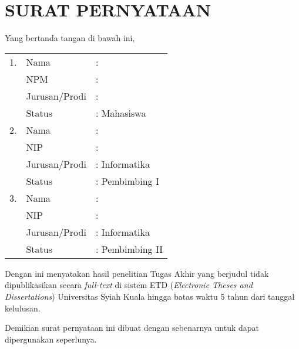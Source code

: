 \chapter*{SURAT PERNYATAAN}

\begin{singlespace}

\noindent
Yang bertanda tangan di bawah ini,
\vspace{-0.1cm}

\begin{table}[H]
\centering
\begin{tabularx}{\textwidth}{llX} %
1. &   Nama  		&: \penulis \\
	&   NPM       	&: \npm   \\
	&   Jurusan/Prodi &: \jurusan \\
	&   Status      	&: Mahasiswa \\  
2.	& Nama  		&: \pembimbingSatu \\
	&   NIP       	&: \nipPembimbingSatu   \\
	&   Jurusan/Prodi &: Informatika \\
	&   Status      	&: Pembimbing I \\  
3.	& Nama  		&: \pembimbingDua \\
	&   NIP       	&: \nipPembimbingDua   \\
	&   Jurusan/Prodi &: Informatika \\
	&   Status      	&: Pembimbing II   
\end{tabularx}
\end{table}

\vspace{-0.4cm}
\noindent
Dengan ini menyatakan hasil penelitian Tugas Akhir yang berjudul \textbf{\Judul} tidak dipublikasikan secara \textit{full-text} di sistem ETD (\textit{Electronic Theses and Dissertations}) Universitas Syiah Kuala hingga batas waktu 5 tahun dari tanggal kelulusan.

\vspace{0.4cm}
\noindent
Demikian surat pernyataan ini dibuat dengan sebenarnya untuk dapat dipergunakan seperlunya.


\end{singlespace}
